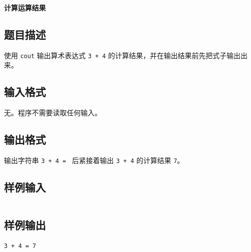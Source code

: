 \documentclass{article}
\newcommand{\problemname}[1]{\begin{center}\Large\bfseries #1\end{center}}
\begin{document}
\problemname{计算运算结果}

\subsection*{题目描述}
使用 \texttt{cout} 输出算术表达式 \texttt{3 + 4} 的计算结果，并在输出结果前先把式子输出出来。

\subsection*{输入格式}
无。程序不需要读取任何输入。

\subsection*{输出格式}
输出字符串 \texttt{3 + 4 = } 后紧接着输出 \texttt{3 + 4} 的计算结果 \texttt{7}。

\subsection*{样例输入}
\begin{verbatim}

\end{verbatim}

\subsection*{样例输出}
\begin{verbatim}
3 + 4 = 7
\end{verbatim}
\end{document}
